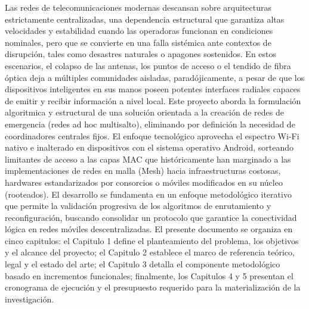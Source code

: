 Las redes de telecomunicaciones modernas descansan sobre arquitecturas estrictamente centralizadas, una dependencia estructural que garantiza altas velocidades y estabilidad cuando las operadoras funcionan en condiciones nominales, pero que se convierte en una falla sistémica ante contextos de disrupción, tales como desastres naturales o apagones sostenidos. En estos escenarios, el colapso de las antenas, los puntos de acceso o el tendido de fibra óptica deja a múltiples comunidades aisladas, paradójicamente, a pesar de que los dispositivos inteligentes en sus manos poseen potentes interfaces radiales capaces de emitir y recibir información a nivel local. Este proyecto aborda la formulación algoritmica y estructural de una solución orientada a la creación de redes de emergencia (redes ad hoc multisalto), eliminando por definición la necesidad de coordinadores centrales fijos. El enfoque tecnológico aprovecha el espectro Wi-Fi nativo e inalterado en dispositivos con el sistema operativo Android, sorteando limitantes de acceso a las capas MAC que históricamente han marginado a las implementaciones de redes en malla (Mesh) hacia infraestructuras costosas, hardwares estandarizados por consorcios o móviles modificados en su núcleo (rooteados). El desarrollo se fundamenta en un enfoque metodológico iterativo que permite la validación progresiva de los algoritmos de enrutamiento y reconfiguración, buscando consolidar un protocolo que garantice la conectividad lógica en redes móviles descentralizadas. El presente documento se organiza en cinco capitulos: el Capitulo 1 define el planteamiento del problema, los objetivos y el alcance del proyecto; el Capitulo 2 establece el marco de referencia teórico, legal y el estado del arte; el Capitulo 3 detalla el componente metodológico basado en incrementos funcionales; finalmente, los Capitulos 4 y 5 presentan el cronograma de ejecución y el presupuesto requerido para la materialización de la investigación.

\newpage
{}


